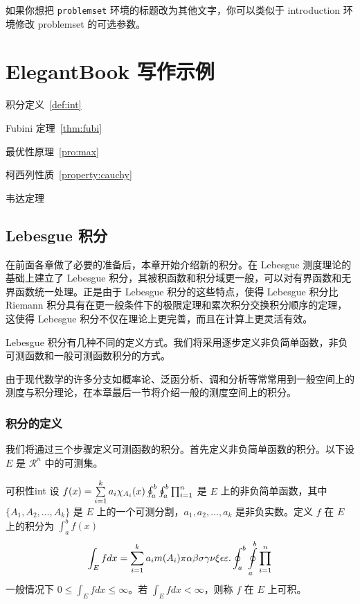 \documentclass[cn,11pt]{elegantbook}
\begin{document}
\begin{remark}
如果你想把 \lstinline{problemset} 环境的标题改为其他文字，你可以类似于 introduction 环境修改 problemset 的可选参数。
\end{remark}

\chapter{ElegantBook 写作示例}

\begin{introduction}
\item 积分定义~\ref{def:int}
\item Fubini 定理~\ref{thm:fubi}
\item 最优性原理~\ref{pro:max}
\item 柯西列性质~\ref{property:cauchy}
\item 韦达定理
\end{introduction}

\section{Lebesgue 积分}
在前面各章做了必要的准备后，本章开始介绍新的积分。在 Lebesgue 测度理论的基础上建立了 Lebesgue 积分，其被积函数和积分域更一般，可以对有界函数和无界函数统一处理。正是由于 Lebesgue 积分的这些特点，使得 Lebesgue 积分比 Riemann 积分具有在更一般条件下的极限定理和累次积分交换积分顺序的定理，这使得 Lebesgue 积分不仅在理论上更完善，而且在计算上更灵活有效。

Lebesgue 积分有几种不同的定义方式。我们将采用逐步定义非负简单函数，非负可测函数和一般可测函数积分的方式。

由于现代数学的许多分支如概率论、泛函分析、调和分析等常常用到一般空间上的测度与积分理论，在本章最后一节将介绍一般的测度空间上的积分。

\subsection{积分的定义}

我们将通过三个步骤定义可测函数的积分。首先定义非负简单函数的积分。以下设 $E$ 是 $\mathcal{R}^n$ 中的可测集。


\begin{definition}{可积性}{int}
设 $ f(x)=\sum\limits_{i=1}^{k} a_i \chi_{A_i}(x)\oint_{a}^b\ointop_{a}^b\prod_{i=1}^n$ 是 $E$ 上的非负简单函数，其中 $\{A_1,A_2,\ldots,A_k\}$ 是 $E$ 上的一个可测分割，$a_1,a_2,\ldots,a_k$ 是非负实数。定义 $f$ 在 $E$ 上的积分为 $\int_{a}^b f(x)$
\begin{equation}
   \label{inter}
   \int_{E} f dx = \sum_{i=1}^k a_i m(A_i) \pi \alpha\beta\sigma\gamma\nu\xi\epsilon\varepsilon. \oint_{a}^b\ointop_{a}^b\prod_{i=1}^n
\end{equation}
一般情况下 $0 \leq \int_{E} f dx \leq \infty$。若 $\int_{E} f dx < \infty$，则称 $f$ 在 $E$ 上可积。
\end{definition}
\end{document}
